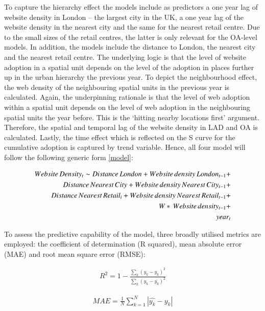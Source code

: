 \documentclass[
  authoryear,
  preprint,
  3p]{elsarticle}
\begin{document}
To capture the hierarchy effect the models include as predictors a one
year lag of website density in London -- the largest city in the UK, a
one year lag of the website density in the nearest city and the same for
the nearest retail centre. Due to the small sizes of the retail centres,
the latter is only relevant for the OA-level models. In addition, the
models include the distance to London, the nearest city and the nearest
retail centre. The underlying logic is that the level of website
adoption in a spatial unit depends on the level of the adoption in
places further up in the urban hierarchy the previous year. To depict
the neighbourhood effect, the web density of the neighbouring spatial
units in the previous year is calculated. Again, the underpinning
rationale is that the level of web adoption within a spatial unit
depends on the level of web adoption in the neighbouring spatial units
the year before. This is the `hitting nearby locations first' argument.
Therefore, the spatial and temporal lag of the website density in LAD
and OA is calculated. Lastly, the time effect which is reflected on the
S curve for the cumulative adoption is captured by trend variable.
Hence, all four model will follow the following generic form
\ref{model}:

\begin{align} \label{model}
Website\,Density_{t} \sim Distance\,London +
Website\,density\,London_{t-1} +\notag\\
Distance\,Nearest\,City +
Website\,density\,Nearest\,City_{t-1} +\notag\\
Distance\,Nearest\,Retail_{i} +
Website\,density\,Nearest\,Retail_{t-1} +\notag\\
W*\, Website\,density_{t-1} +\notag\\ 
year_{t}
\end{align}

To assess the predictive capability of the model, three broadly utilised
metrics are employed: the coefficient of determination (R squared), mean
absolute error (MAE) and root mean square error (RMSE):

\begin{align}
R^2 = 1 - \frac{\sum_{k} (y_{k} - \hat{y_{k}})^2} {\sum_{k} (y_{k} - \overline{y_{k}})^2} \label{eq:rsquared}
\end{align}

\begin{align}
MAE = \frac{1}{N} \sum_{k = 1}^{N} |\hat{y_{k}} - y_{k}| \label{eq:mae}
\end{align}
\end{document}
